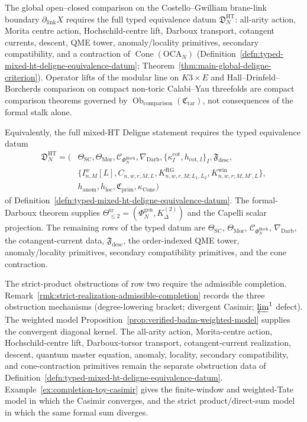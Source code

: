 \documentclass[11pt]{memoir}
\begin{document}
The global open--closed comparison on the Costello--Gwilliam
brane-link boundary \(\partial_{\mathrm{link}}X\) requires the full
typed equivalence datum \(\mathfrak D^{\mathrm{HT}}_N\): all-arity
action, Morita centre action, Hochschild-centre lift, Darboux transport,
cotangent currents, descent, QME tower, anomaly/locality primitives,
secondary compatibility, and a contraction of
\(\operatorname{Cone}(\mathrm{OCA}_N)\)
(Definition~\ref{defn:typed-mixed-ht-deligne-equivalence-datum};
Theorem~\ref{thm:main-global-deligne-criterion}).  Operator lifts of the
modular line on \(K3\times E\) and Hall--Drinfeld--Borcherds comparison
on compact non-toric Calabi--Yau threefolds are compact comparison
theorems governed by
\(\operatorname{Ob}_{\mathrm{comparison}}(\mathfrak C_{\mathrm{tar}})\), not
consequences of the formal stalk alone.

Equivalently, the full mixed-HT Deligne statement requires the typed
equivalence datum
\[
\begin{aligned}
  \mathfrak D^{\mathrm{HT}}_N
  =
  (&\Theta_{\mathrm{SC}},\Theta_{\mathrm{Mor}},
    \mathcal C_{\Phi_N^{\mathrm{Hoch}}},
    \nabla_{\mathrm{Darb}},\{\kappa^{\mathrm{cot}}_I,h_{\mathrm{cot},I}\}_I,
    \mathfrak F_{\mathrm{desc}},\\
   &\{I^w_{n,M}[L],C_{n,w,r,M,L},
      K^{\mathrm{RG}}_{n,w,r,M;L_1,L_2},
      K^{\mathrm{win}}_{n,w,r;M,M',L}\},\\
   &h_{\mathrm{anom}},h_{\mathrm{loc}},
    \mathfrak C_{\mathrm{prim}},
    \kappa_{\operatorname{Cone}})
\end{aligned}
\]
of Definition~\ref{defn:typed-mixed-ht-deligne-equivalence-datum}.  The
formal-Darboux theorem supplies
\(\Theta^{\mathrm{tr}}_{\leq 2}=(\Phi_N^{\mathrm{gen}},K^{(2)}_\Delta)\)
and the Capelli scalar projection.  The remaining rows of the typed datum
are \(\Theta_{\mathrm{SC}}\), \(\Theta_{\mathrm{Mor}}\),
\(\mathcal C_{\Phi_N^{\mathrm{Hoch}}}\), \(\nabla_{\mathrm{Darb}}\), the
cotangent-current data, \(\mathfrak F_{\mathrm{desc}}\), the order-indexed
QME tower, anomaly/locality primitives, secondary compatibility
primitives, and the cone contraction.

The strict-product obstructions of row two require the admissible
completion.  Remark~\ref{rmk:strict-realization-admissible-completion} records
the three obstruction mechanisms (degree-lowering bracket; divergent
Casimir; \(\varprojlim^1\) defect).  The weighted model
Proposition~\ref{prop:verified-badm-weighted-model} supplies the
convergent diagonal kernel.  The all-arity action, Morita-centre action,
Hochschild-centre lift, Darboux-torsor transport, cotangent-current
realization, descent, quantum master equation, anomaly, locality,
secondary compatibility, and cone-contraction primitives remain the
separate obstruction data of
Definition~\ref{defn:typed-mixed-ht-deligne-equivalence-datum}.
Example~\ref{ex:completion-toy-casimir} gives the finite-window and
weighted-Tate model in which the Casimir converges, and the strict
product/direct-sum model in which the same formal sum diverges.
\end{document}
